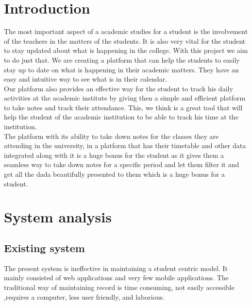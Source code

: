 \documentclass{article}
\begin{document}
\newpage

\section{Introduction}
\hspace{1em}

\Large
The most important aspect of a academic studies for a student is the involvement of the teachers in the matters of the students. It is also very vital for the student to stay updated about what is happening in the college. With this project we aim to do just that. We are creating a platform that can help the students to easily stay up to date on what is happening in their academic matters. They have an easy and intuitive way to see what is in their calendar.\\

\vspace{1em}
\Large
Our platform also provides an effective way for the student to track his daily activities at the academic institute by giving then a simple and efficient platform to take notes and track their attendance. This, we think is a great tool that will help the student of the academic institution to be able to track his time at the institution.\\

\vspace{1em}
\Large
The platform with its ability to take down notes for the classes they are attending in the university, in a platform that has their timetable and other data integrated along with it is a huge bonus for the student as it gives them a seamless way to take down notes for a specific period and let them filter it and get all the dada beautifully presented to them which is a huge bonus for a student.

\newpage


\newpage

\section{System analysis}
\hspace{1em}

\subsection{Existing system}

\Large
The present system is ineffective in maintaining a student centric model. It mainly consisted of web applications and very few mobile applications. The traditional way of maintaining record is time consuming, not easily accessible ,requires a computer, less user friendly, and laborious.\\
\end{document}
